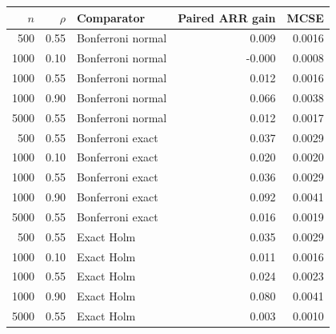 \begin{tabular}{rrlrr}
\toprule
$n$ & $\rho$ & Comparator & Paired ARR gain & MCSE \\
\midrule
500 & 0.55 & Bonferroni normal & 0.009 & 0.0016 \\
1000 & 0.10 & Bonferroni normal & -0.000 & 0.0008 \\
1000 & 0.55 & Bonferroni normal & 0.012 & 0.0016 \\
1000 & 0.90 & Bonferroni normal & 0.066 & 0.0038 \\
5000 & 0.55 & Bonferroni normal & 0.012 & 0.0017 \\
500 & 0.55 & Bonferroni exact & 0.037 & 0.0029 \\
1000 & 0.10 & Bonferroni exact & 0.020 & 0.0020 \\
1000 & 0.55 & Bonferroni exact & 0.036 & 0.0029 \\
1000 & 0.90 & Bonferroni exact & 0.092 & 0.0041 \\
5000 & 0.55 & Bonferroni exact & 0.016 & 0.0019 \\
500 & 0.55 & Exact Holm & 0.035 & 0.0029 \\
1000 & 0.10 & Exact Holm & 0.011 & 0.0016 \\
1000 & 0.55 & Exact Holm & 0.024 & 0.0023 \\
1000 & 0.90 & Exact Holm & 0.080 & 0.0041 \\
5000 & 0.55 & Exact Holm & 0.003 & 0.0010 \\
\bottomrule
\end{tabular}
